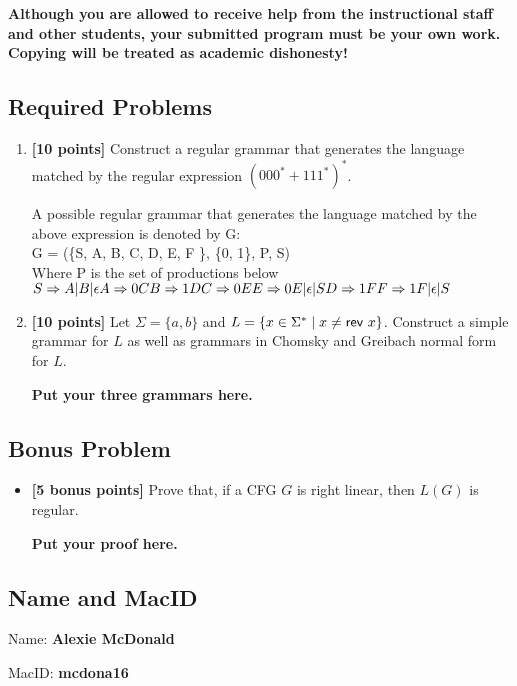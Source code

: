 \documentclass[11pt,fleqn]{article}
\newcommand{\mname}[1]{\mbox{\sf #1}}
\newcommand{\set}[1]{{\{ #1 \}}}
\begin{document}
\textbf{Although you are allowed to receive help from the
  instructional staff and other students, your submitted program must
  be your own work.  Copying will be treated as academic dishonesty!}

\newpage

\subsection*{Required Problems}

\begin{enumerate}

  \item \textbf{[10 points]} Construct a regular grammar that
    generates the language matched by the regular expression $(000^* +
    111^*)^*$.

  \bigskip

   A possible regular grammar that generates the language matched by the above expression is denoted by G:\\
  
   G = (\{S, A, B, C, D, E, F \}, \{0, 1\}, P, S)\\
   Where P is the set of productions below 
    $S \Rightarrow  A | B | \epsilon \\
    A  \Rightarrow 0C \\
    B \Rightarrow 1D \\
    C  \Rightarrow 0E \\
    E \Rightarrow 0E | \epsilon | S \\
    D \Rightarrow 1F \\
    F  \Rightarrow 1F | \epsilon | S$

  \bigskip

  \item \textbf{[10 points]} Let $\Sigma = \set{a,b}$ and $L = \set{x
    \in \Sigma^* \mid x \not= \mname{rev}\ x}$.  Construct a simple
    grammar for $L$ as well as grammars in Chomsky and Greibach normal
    form for $L$.

  \bigskip

  \textbf{Put your three grammars here.}  

\end{enumerate}

\subsection*{Bonus Problem}

\begin{itemize}

  \item[] \textbf{[5 bonus points]} Prove that, if a CFG $G$ is right
    linear, then $L(G)$ is regular.

  \bigskip

  \textbf{Put your proof here.} 

\end{itemize}

\subsection*{Name and MacID}

\medskip

Name: \textbf{Alexie McDonald}

\bigskip

\noindent
MacID: \textbf{mcdona16}
\end{document}
